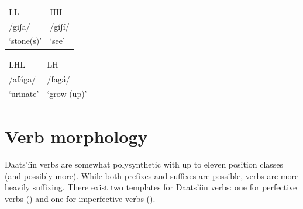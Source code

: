 \documentclass[output=paper]{langsci/langscibook}
\begin{document}
\ea\label{ex:ahlandc:4}

\begin{tabular}{ll}
LL &   HH  \\
/giʃa/  &    /g\'{i}ʃ\'{i}/ \\
‘stone(s)’    &  ‘see’ \\
 \end{tabular}
\z

\ea\label{ex:ahlandc:5}

\begin{tabular}{ll}
LHL   &     LH \\
  /af\'{a}ga/   &  /fag\'{a}/ \\
  ‘urinate’  &  ‘grow (up)’ \\
\end{tabular}
\z 

\section{Verb morphology}\label{sec:ahlandc:4}

Daats’\'{i}in verbs are somewhat polysynthetic with up to eleven position classes (and possibly more). While both prefixes and suffixes are possible, verbs are more heavily suffixing. There exist two templates for Daats’\'{i}in verbs: one for perfective verbs () and one for imperfective verbs ().
\end{document}
